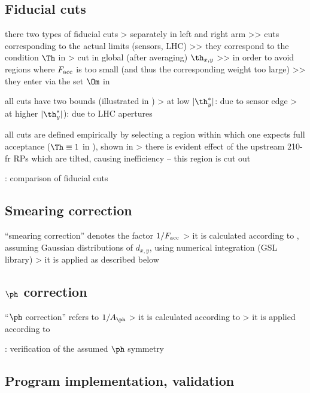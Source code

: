 \subsection{Fiducial cuts}

\> there two types of fiducial cuts
\>> separately in left and right arm
\>>> cuts corresponding to the actual limits (sensors, LHC)
\>>> they correspond to the condition $\Th$ in 
\>> cut in global (after averaging) $\th_{x, y}$
\>>> in order to avoid regions where $F_{\rm acc}$ is too small (and thus the corresponding weight too large)
\>>> they enter via the set $\Om$ in 

\> all cuts have two bounds (illustrated in )
\>> at low $|\th_y^*|$: due to sensor edge
\>> at higher $|\th_y^*|$): due to LHC apertures

\> all cuts are defined empirically by selecting a region within which one expects full acceptance ($\Th \equiv 1$ in ), shown in 
\>> there is evident effect of the upstream 210-fr RPs which are tilted, causing inefficiency -- this region is cut out

\> : comparison of fiducial cuts


\subsection{Smearing correction}

\> ``smearing correction'' denotes the factor $1/F_{\rm acc}$
\>> it is calculated according to , assuming Gaussian distributions of $d_{x,y}$, using numerical integration (GSL library)
\>> it is applied as described below 


\subsection{$\ph$ correction}

\> ``$\ph$ correction'' refers to $1 / A_{\ph}$
\>> it is calculated according to 
\>> it is applied according to 


\>  : verification of the assumed $\ph$ symmetry


\subsection{Program implementation, validation}

